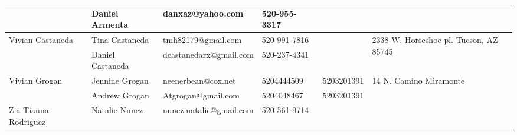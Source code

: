 \documentclass[landscape]{article}\usepackage[]{graphicx}\usepackage[]{color}
\begin{document}
\begin{longtable}{|p{100pt}|p{100pt}|p{140pt}|p{60pt}|p{64pt}|p{120pt}|}
 & Daniel Armenta & danxaz@yahoo.com & 520-955-3317 &  & \\
\hline
\multirow{2}{100pt}{Vivian Castaneda} & Tina Castaneda & tmh82179@gmail.com & 520-991-7816 &  & \multirow{2}{120pt}{2338 W. Horseshoe pl. Tucson, AZ 85745} \\
 & Daniel Castaneda & dcastanedarx@gmail.com & 520-237-4341 &  & \\
\hline
\multirow{2}{100pt}{Vivian Grogan} & Jennine Grogan & neenerbean@cox.net & 5204444509 & 5203201391 & \multirow{2}{120pt}{14 N. Camino Miramonte} \\
 & Andrew Grogan  & Atgrogan@gmail.com  & 5204048467 & 5203201391 & \\
\hline
\multirow{2}{100pt}{Zia Tianna Rodriguez} & Natalie Nunez & nunez.natalie@gmail.com & 520-561-9714 &  & \multirow{2}{120pt}{} \\
 &  &  &  &  & \\
\hline
\end{longtable}
\newpage
\end{document}
